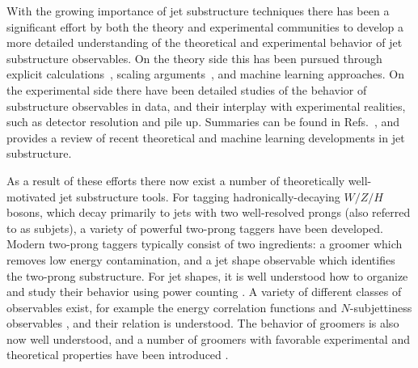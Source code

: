 \documentclass[11pt,letterpaper]{article}
\DeclareRobustCommand{\Refs}[1]{Refs.~\cite{#1}}
\begin{document}
With the growing importance of jet substructure techniques there has been a significant effort by both the theory and experimental communities to develop a more detailed understanding of the theoretical and experimental behavior of jet substructure observables.
%
On the theory side this has been pursued through explicit calculations~\cite{Feige:2012vc,Field:2012rw,Dasgupta:2013ihk,Dasgupta:2013via,Larkoski:2014pca,Dasgupta:2015yua,Seymour:1997kj,Li:2011hy,Larkoski:2012eh,Jankowiak:2012na,Chien:2014nsa,Chien:2014zna,Isaacson:2015fra,Krohn:2012fg,Waalewijn:2012sv,Larkoski:2014tva,Procura:2014cba,Bertolini:2015pka,Bhattacherjee:2015psa,Larkoski:2015kga,Dasgupta:2015lxh,Frye:2016okc,Frye:2016aiz,Kang:2016ehg,Hornig:2016ahz,Marzani:2017mva,Marzani:2017kqd,Hoang:2017kmk,Larkoski:2017cqq,Larkoski:2017iuy}, scaling arguments~\cite{Walsh:2011fz,Larkoski:2014gra,Larkoski:2014zma}, and machine learning \cite{Cogan:2014oua,deOliveira:2015xxd,Almeida:2015jua,Baldi:2016fql,Guest:2016iqz,Conway:2016caq,Barnard:2016qma} approaches.
%
On the experimental side there have been detailed studies of the behavior of substructure observables in data, and their interplay with experimental realities, such as detector resolution and pile up.
%
Summaries can be found in \Refs{Abdesselam:2010pt,Altheimer:2012mn,Altheimer:2013yza,Adams:2015hiv}, and \cite{Larkoski:2017jix} provides a review of recent theoretical and machine learning developments in jet substructure. 

As a result of these efforts there now exist a number of theoretically well-motivated jet substructure tools.
%
For tagging hadronically-decaying $W/Z/H$ bosons, which decay primarily to jets with two well-resolved prongs (also referred to as subjets), a variety of powerful two-prong taggers have been developed.
%
Modern two-prong taggers typically consist of two ingredients: a groomer which removes low energy contamination, and a jet shape observable which identifies the two-prong substructure.
%
For jet shapes, it is well understood how to organize and study their
behavior using power counting \cite{Larkoski:2014gra}.
%
A variety of
different classes of observables exist, for example the energy
correlation functions \cite{Larkoski:2013eya,Moult:2016cvt,Komiske:2017aww} and $N$-subjettiness
observables \cite{Thaler:2010tr,Thaler:2011gf}, and their relation is
understood.
%
The behavior of groomers is also now well understood, and
a number of groomers with favorable experimental and theoretical properties have been introduced
\cite{Dasgupta:2013ihk,Larkoski:2014wba}.
\end{document}
